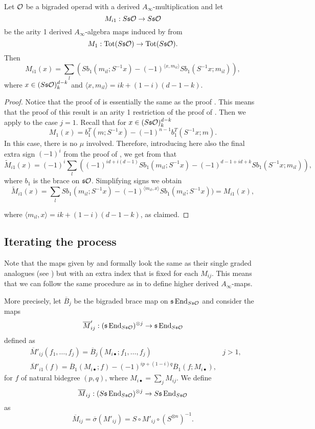 \documentclass[join.tex]{subfiles}
\begin{document}
\begin{corollary}\label{mi1}
Let ${\mathcal O}$ be a bigraded operad with a derived $A_\infty$-multiplication and let \[M_{i1}:S\mathfrak{s}{\mathcal O}\to S\mathfrak{s}{\mathcal O}\] be the arity 1 derived $A_\infty$-algebra maps induced by  from \[M_1:\mathrm{Tot}(S\mathfrak{s}{\mathcal O})\to \mathrm{Tot}(S\mathfrak{s}{\mathcal O}).\]
Then \[M_{i1}(x)= \sum_l (Sb_1(m_{il};S^{-1}x)-(-1)^{\langle x,m_{il}\rangle}Sb_1(S^{-1}x;m_{il})),\]
where $x\in (S\mathfrak{s}{\mathcal O})^{d-k}_k$ and $\langle x,m_{il}\rangle=ik+(1-i)(d-1-k)$.
\end{corollary}
\begin{proof}
Notice that the proof of  is essentially the same as the proof . This means that the proof of this result is an arity 1 restriction of the proof of . Then we apply  to the case $j=1$. Recall that for $x\in (S\mathfrak{s}{\mathcal O})^{d-k}_{k}$
\[M_1(x)=b_1^T(m;S^{-1}x)-(-1)^{n-1}b_1^T(S^{-1}x;m).\]
 In this case, there is no $\mu$ involved. Therefore, introducing here also the final extra sign $(-1)^i$ from the proof of , we get from  that
\[\widetilde{M}_{i1}(x)=(-1)^i\sum_l((-1)^{id+i(d-1)} Sb_1(m_{il};S^{-1}x)-(-1)^{d-1+id+k}Sb_1(S^{-1}x;m_{il})),\] where $b_1$ is the brace on $\mathfrak{s}{\mathcal O}$. Simplifying signs we obtain
\[\widetilde{M}_{i1}(x)=\sum_l Sb_1(m_{il};S^{-1}x)-(-1)^{\langle  m_{il},x\rangle}Sb_1(m_{il};S^{-1}x))=M_{i1}(x),\]

where $\langle  m_{il},x\rangle=ik+(1-i)(d-1-k)$, as claimed.
\end{proof}

\subsection{Iterating the process}

Note that the maps given by  and  formally look the same as their single graded analogues (see ) but with an extra index that is fixed for each $M_{ij}$. This means that we can follow the same procedure as in  to define higher derived $A_\infty$-maps. 

More precisely, let $\overline{B}_j$ be the bigraded brace map on $\mathfrak{s}\operatorname{End}_{S\mathfrak{s}{\mathcal O}}$ and consider the maps 
\begin{equation}\label{barbimaps}
\overline{M}'_{ij}:(\mathfrak{s}\operatorname{End}_{S\mathfrak{s}{\mathcal O}})^{\otimes j}\to \mathfrak{s}\operatorname{End}_{S\mathfrak{s}{\mathcal O}}
\end{equation}
defined as 
\begin{align*}
&\overline{M}'_{ij}(f_1,\dots,f_j)=\overline{B}_j(M_{i\bullet};f_1,\dots, f_j) & j>1,\\
&\overline{M}'_{i1}(f)=\overline{B}_1(M_{i\bullet};f)-(-1)^{ip+(1-i)q}\overline{B}_1(f;M_{i\bullet}),
\end{align*}
for $f$ of natural bidegree $(p,q)$, where $M_{i\bullet}=\sum_j M_{ij}$. We define 
\[\overline{M}_{ij}:(S\mathfrak{s}\operatorname{End}_{S\mathfrak{s}{\mathcal O}})^{\otimes j}\to S\mathfrak{s}\operatorname{End}_{S\mathfrak{s}{\mathcal O}}\]
as \[\overline{M}_{ij} = \overline{\sigma}(M'_{ij})=S\circ M'_{ij}\circ (S^{\otimes n})^{-1}.\]
\end{document}

